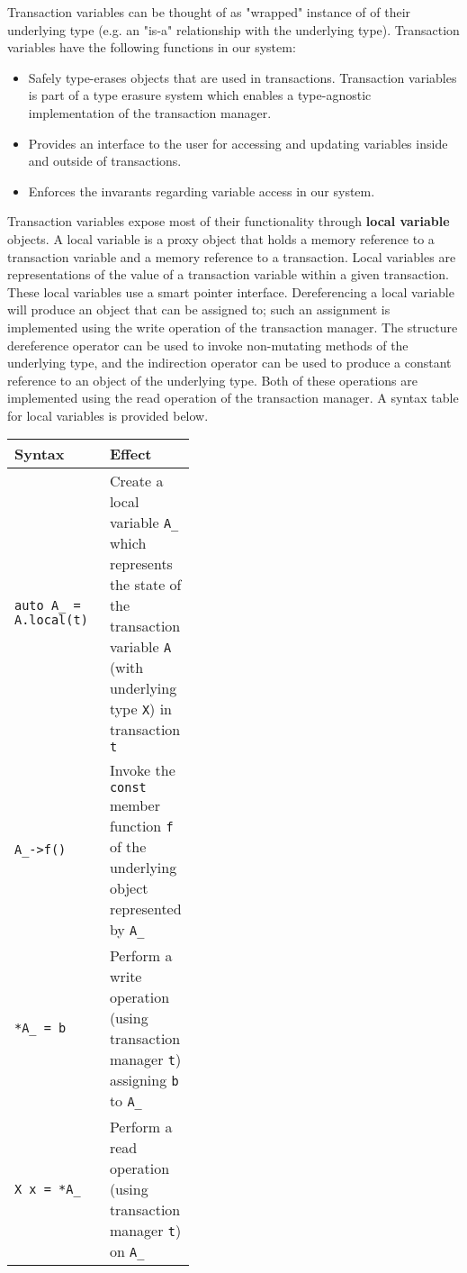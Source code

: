 \documentclass[conference]{IEEEtran}
\begin{document}
Transaction variables can be thought of as "wrapped" instance of of their underlying type (e.g. an "is-a" relationship with the underlying type). Transaction variables have the following functions in our system:

\begin{itemize}
\item Safely type-erases objects that are used in transactions. Transaction variables is
part of a type erasure system which enables a type-agnostic implementation of
the transaction manager.
\item Provides an interface to the user for accessing and updating variables
inside and outside of transactions.
\item Enforces the invarants regarding variable access in our system.
\end{itemize}

Transaction variables expose most of their functionality through \textbf{local variable} objects. A local variable is a proxy object that holds a memory reference to a transaction variable and a memory reference to a transaction. Local variables are representations of the value of a transaction variable within a given transaction. These local variables use a smart pointer interface. Dereferencing a local variable will produce an object that can be assigned to; such an assignment is implemented using the write operation of the transaction manager. The structure dereference operator can be used to invoke non-mutating methods of the underlying type, and the indirection operator can be used to produce a constant reference to an object of the underlying type. Both of these operations are implemented using the read operation of the transaction manager. A syntax table for local variables is provided below.

\begin{table}[htbp]
\center
\begin{tabular}{|l|m{0.4\linewidth}|}
\hline
\textbf{Syntax}			& \textbf{Effect} \\
\hline
\lstinline$auto A_ = A.local(t)$		& Create a local variable \lstinline$A_$ which represents the state of the transaction variable \lstinline$A$ (with underlying type \lstinline$X$) in transaction \lstinline$t$ \\
\lstinline$A_->f()$		& Invoke the \lstinline$const$ member function \lstinline$f$ of the underlying object represented by \lstinline$A_$ \\
\lstinline$*A_ = b$		& Perform a write operation (using transaction manager \lstinline$t$) assigning \lstinline$b$ to \lstinline$A_$ \\
\lstinline$X x = *A_$	& Perform a read operation (using transaction manager \lstinline$t$) on \lstinline$A_$ \\
\hline
\end{tabular}
\end{table}
\end{document}
